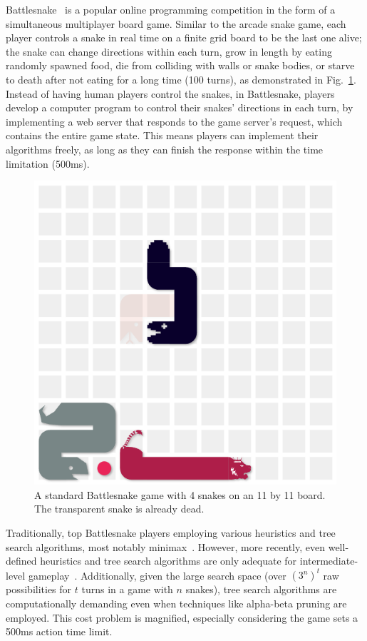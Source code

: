 \documentclass[conference]{IEEEtran}
\begin{document}
Battlesnake~\cite{battlesnake}
is a popular online programming competition in the form of a simultaneous
multiplayer board game. Similar to the arcade snake game,
each player controls a snake in real time on a finite grid board to be the last
one alive; the snake can change directions within each turn,
grow in length by eating randomly spawned food,
die from colliding with walls or snake bodies,
or starve to death after not eating for a long time (100 turns),
as demonstrated in Fig.~\ref{fig:game}.
Instead of having human players control the snakes, in Battlesnake,
players develop a computer program to control their snakes' directions in each
turn, by implementing a web server that responds to the game server's request,
which contains the entire game state.
This means players can implement their algorithms freely,
as long as they can finish the response within the time limitation (500ms).

\begin{figure}
    \centering
    \includegraphics[width=\linewidth]{snake_game_screenshot.png}
    \caption{A standard Battlesnake game with 4 snakes on an 11 by 11 board.
        The transparent snake is already dead.
    }
    \label{fig:game}
\end{figure}

Traditionally,
top Battlesnake players employing various heuristics and tree search
algorithms,
most notably minimax~\cite{hill2018building,binnersley2020battlesnake}. However,
more recently,
even well-defined heuristics and tree search algorithms are only adequate for
intermediate-level gameplay~\cite{schier2019adversarial}. Additionally,
given the large search space (over $(3^n)^t$ raw possibilities for $t$ turns in
a game with $n$ snakes),
tree search algorithms are computationally demanding even when techniques like
alpha-beta pruning are employed. This cost problem is magnified,
especially considering the game sets a 500ms action time limit.
\end{document}

